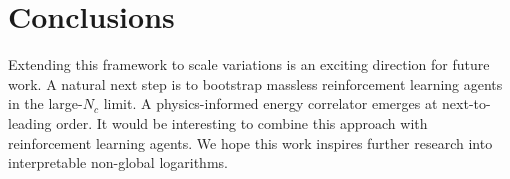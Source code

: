 \section{Conclusions}\label{sec:conclusions}

Extending this framework to scale variations is an exciting direction
for future work. A natural next step is to bootstrap massless
reinforcement learning agents in the large-$N_c$ limit. A
physics-informed energy correlator emerges at next-to-leading order. It
would be interesting to combine this approach with reinforcement
learning agents. We hope this work inspires further research into
interpretable non-global logarithms.

